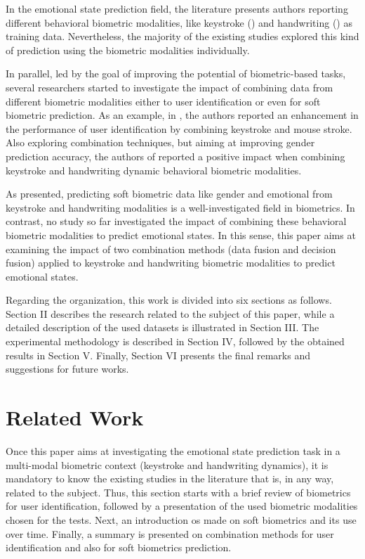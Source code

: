 \documentclass[conference]{IEEEtran}
\begin{document}
In the emotional state prediction field, the literature presents authors reporting different behavioral biometric modalities, like keystroke (\cite{ks-emotion1, ks-emotion2-mouse}) and handwriting (\cite{cheng-emotional}) as training data. Nevertheless, the majority of the existing studies explored this kind of prediction using the biometric modalities individually.

In parallel, led by the goal of improving the potential of biometric-based tasks, several researchers started to investigate the impact of combining data from different biometric modalities \cite{combine} either to user identification or even for soft biometric prediction. As an example, in \cite{marjorie-comb}, the authors reported an enhancement in the performance of user identification by combining keystroke and mouse stroke. Also exploring combination techniques, but aiming at improving gender prediction accuracy, the authors of \cite{combining-gender} reported a positive impact when combining keystroke and handwriting dynamic behavioral biometric modalities.

As presented, predicting soft biometric data like gender and emotional from keystroke and handwriting modalities is a well-investigated field in biometrics. In contrast, no study so far investigated the impact of combining these behavioral biometric modalities to predict emotional states. In this sense, this paper aims at examining the impact of two combination methods (data fusion and decision fusion) applied to keystroke and handwriting biometric modalities to predict emotional states.

Regarding the organization, this work is divided into six sections as follows. Section II describes the research related to the subject of this paper, while a detailed description of the used datasets is illustrated in Section III. The experimental methodology is described in Section IV, followed by the obtained results in Section V. Finally, Section VI presents the final remarks and suggestions for future works. 

\section{Related Work}\label{related-work}

Once this paper aims at investigating the emotional state prediction task in a multi-modal biometric context (keystroke and handwriting dynamics), it is mandatory to know the existing studies in the literature that is, in any way, related to the subject. Thus, this section starts with a brief review of biometrics for user identification, followed by a presentation of the used biometric modalities chosen for the tests. Next, an introduction os made on soft biometrics and its use over time. Finally, a summary is presented on combination methods for user identification and also for soft biometrics prediction.
\end{document}
